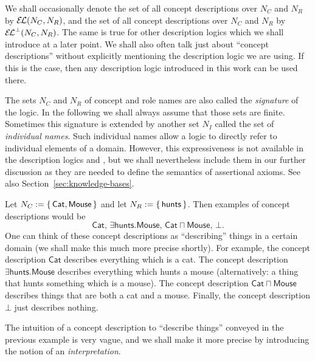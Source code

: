 We shall occasionally denote the set of all \EL concept descriptions over $N_C$ and $N_R$
by ${\mathcal{E}\kern-.3ex\mathcal{L}}(N_C, N_R)$, and the set of all \ELbot concept descriptions over $N_C$ and $N_R$ by
${{\mathcal{E}\kern-.3ex\mathcal{L}}^\bot}(N_C, N_R)$.  The same is true for other description logics which we shall
introduce at a later point.  We shall also often talk just about \enquote{concept
  descriptions} without explicitly mentioning the description logic we are using.  If this
is the case, then any description logic introduced in this work can be used there.

The sets $N_C$ and $N_R$ of concept and role names are also called the \emph{signature} of
the logic.  In the following we shall always assume that those sets are finite.  Sometimes
this signature is extended by another set $N_I$ called the set of \emph{individual names}.
Such individual names allow a logic to directly refer to individual elements of a domain.
However, this expressiveness is not available in the description logics \EL and \ELbot,
but we shall nevertheless include them in our further discussion as they are needed to
define the semantics of assertional axioms.  See also Section~\ref{sec:knowledge-bases}.

\begin{Example}
  \label{expl:tom-and-jerry-1}
  Let $N_C := {\{\, \mathsf{Cat}, \mathsf{Mouse} \,\}}$ and let $N_R := {\{\, \mathsf{hunts}
  \,\}}$.  Then examples of \ELbot concept descriptions would be
  \begin{equation*}
    \mathsf{Cat}, \, \mathsf{\exists hunts. Mouse}, \, \mathsf{Cat \sqcap Mouse}, \, \bot.
  \end{equation*}
  One can think of these concept descriptions as \enquote{describing} things in a certain
  domain (we shall make this much more precise shortly).  For example, the concept
  description $\mathsf{Cat}$ describes everything which is a cat.  The concept description
  $\mathsf{\exists hunts. Mouse}$ describes everything which hunts a mouse (alternatively:
  a thing that hunts something which is a mouse).  The concept description $\mathsf{Cat
    \sqcap Mouse}$ describes things that are both a cat and a mouse.  Finally, the concept
  description $\bot$ just describes nothing.
\end{Example}

The intuition of a concept description to \enquote{describe things} conveyed in the
previous example is very vague, and we shall make it more precise by introducing the
notion of an \emph{interpretation}.

